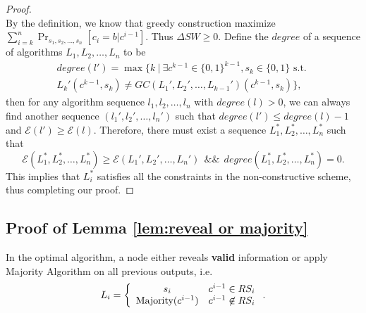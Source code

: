 \documentclass[a4paper,UKenglish]{lipics}
\theoremstyle{definition}
\begin{document}
\begin{proof}
\begin{equation*}
\end{equation*}
By the definition, we know that greedy construction maximize $\sum_{i=k}^n \Pr_{s_1, s_2, \dots, s_n} [c_i = b|c^{i-1}]$. 
Thus $\Delta SW \geq 0$.
Define the $degree$ of a sequence of algorithms $L_1, L_2, \dots, L_n$ to be
\begin{multline}
	degree(l') 
= 
	\max \Big\{ k 
		~ \Big| ~ 
			\exists c^{k-1} \in \{0,1\}^{k-1}, s_k \in \{0,1\} \text{ s.t. } 
			\\
			L_k'(c^{k-1}, s_k) \not= GC(L_1', L_2', \dots, L_{k-1}')(c^{k-1}, s_k)
		\Big\},
\end{multline}
then for any algorithm sequence $l_1, l_2, \dots, l_n$ with $degree(l)>0$, we can always find another sequence $(l_1', l_2', \dots, l_n')$ such that 
	$degree(l') \leq degree(l) - 1$ and $\mathcal{E}(l')\geq \mathcal{E}(l)$.
Therefore, there must exist a sequence $L_1^*, L_2^*, \dots, L_n^*$ such that 
\begin{equation*}
\mathcal{E}(L_1^*, L_2^*, \dots, L_n^*) \geq \mathcal{E}(L_1', L_2', \dots, L_n')
~~\&\&~~
degree(L_1^*, L_2^*, \dots, L_n^*) = 0.
\end{equation*}
This implies that $L_i^*$ satisfies all the constraints in the non-constructive scheme, thus completing our proof.
\end{proof}



\subsection {Proof of Lemma \ref{lem:reveal or majority}}
\label{subsec:reveal or majority}
In the optimal algorithm, a node either reveals \textbf{valid} information or apply Majority Algorithm on all previous outputs, i.e.
\begin{equation*}
L_i 
= \left\{ 
	\begin{array}{c l}
		s_i & c^{i-1} \in RS_i \\
 		\text{Majority}(c^{i-1}) & c^{i-1} \not \in RS_i
 	\end{array}
\right..
\end{equation*}
\end{document}
